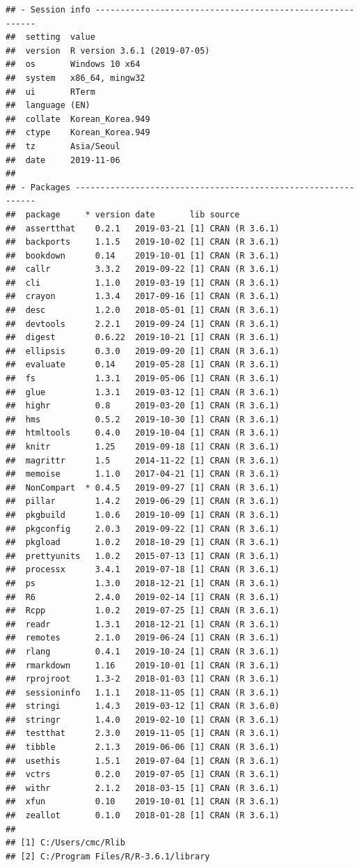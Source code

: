 \documentclass[12pt,]{krantz}
\begin{document}
\begin{verbatim}
## - Session info ----------------------------------------------------------
##  setting  value                       
##  version  R version 3.6.1 (2019-07-05)
##  os       Windows 10 x64              
##  system   x86_64, mingw32             
##  ui       RTerm                       
##  language (EN)                        
##  collate  Korean_Korea.949            
##  ctype    Korean_Korea.949            
##  tz       Asia/Seoul                  
##  date     2019-11-06                  
## 
## - Packages --------------------------------------------------------------
##  package     * version date       lib source        
##  assertthat    0.2.1   2019-03-21 [1] CRAN (R 3.6.1)
##  backports     1.1.5   2019-10-02 [1] CRAN (R 3.6.1)
##  bookdown      0.14    2019-10-01 [1] CRAN (R 3.6.1)
##  callr         3.3.2   2019-09-22 [1] CRAN (R 3.6.1)
##  cli           1.1.0   2019-03-19 [1] CRAN (R 3.6.1)
##  crayon        1.3.4   2017-09-16 [1] CRAN (R 3.6.1)
##  desc          1.2.0   2018-05-01 [1] CRAN (R 3.6.1)
##  devtools      2.2.1   2019-09-24 [1] CRAN (R 3.6.1)
##  digest        0.6.22  2019-10-21 [1] CRAN (R 3.6.1)
##  ellipsis      0.3.0   2019-09-20 [1] CRAN (R 3.6.1)
##  evaluate      0.14    2019-05-28 [1] CRAN (R 3.6.1)
##  fs            1.3.1   2019-05-06 [1] CRAN (R 3.6.1)
##  glue          1.3.1   2019-03-12 [1] CRAN (R 3.6.1)
##  highr         0.8     2019-03-20 [1] CRAN (R 3.6.1)
##  hms           0.5.2   2019-10-30 [1] CRAN (R 3.6.1)
##  htmltools     0.4.0   2019-10-04 [1] CRAN (R 3.6.1)
##  knitr         1.25    2019-09-18 [1] CRAN (R 3.6.1)
##  magrittr      1.5     2014-11-22 [1] CRAN (R 3.6.1)
##  memoise       1.1.0   2017-04-21 [1] CRAN (R 3.6.1)
##  NonCompart  * 0.4.5   2019-09-27 [1] CRAN (R 3.6.1)
##  pillar        1.4.2   2019-06-29 [1] CRAN (R 3.6.1)
##  pkgbuild      1.0.6   2019-10-09 [1] CRAN (R 3.6.1)
##  pkgconfig     2.0.3   2019-09-22 [1] CRAN (R 3.6.1)
##  pkgload       1.0.2   2018-10-29 [1] CRAN (R 3.6.1)
##  prettyunits   1.0.2   2015-07-13 [1] CRAN (R 3.6.1)
##  processx      3.4.1   2019-07-18 [1] CRAN (R 3.6.1)
##  ps            1.3.0   2018-12-21 [1] CRAN (R 3.6.1)
##  R6            2.4.0   2019-02-14 [1] CRAN (R 3.6.1)
##  Rcpp          1.0.2   2019-07-25 [1] CRAN (R 3.6.1)
##  readr         1.3.1   2018-12-21 [1] CRAN (R 3.6.1)
##  remotes       2.1.0   2019-06-24 [1] CRAN (R 3.6.1)
##  rlang         0.4.1   2019-10-24 [1] CRAN (R 3.6.1)
##  rmarkdown     1.16    2019-10-01 [1] CRAN (R 3.6.1)
##  rprojroot     1.3-2   2018-01-03 [1] CRAN (R 3.6.1)
##  sessioninfo   1.1.1   2018-11-05 [1] CRAN (R 3.6.1)
##  stringi       1.4.3   2019-03-12 [1] CRAN (R 3.6.0)
##  stringr       1.4.0   2019-02-10 [1] CRAN (R 3.6.1)
##  testthat      2.3.0   2019-11-05 [1] CRAN (R 3.6.1)
##  tibble        2.1.3   2019-06-06 [1] CRAN (R 3.6.1)
##  usethis       1.5.1   2019-07-04 [1] CRAN (R 3.6.1)
##  vctrs         0.2.0   2019-07-05 [1] CRAN (R 3.6.1)
##  withr         2.1.2   2018-03-15 [1] CRAN (R 3.6.1)
##  xfun          0.10    2019-10-01 [1] CRAN (R 3.6.1)
##  zeallot       0.1.0   2018-01-28 [1] CRAN (R 3.6.1)
## 
## [1] C:/Users/cmc/Rlib
## [2] C:/Program Files/R/R-3.6.1/library
\end{verbatim}
\end{document}
